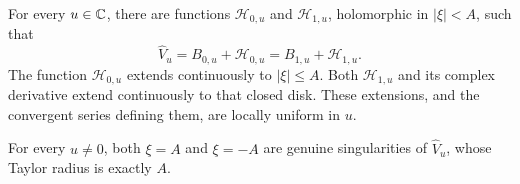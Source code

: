 \begin{theorem}
\label{thm:Borel-models}
For every $u\in\mathbb C$, there are functions $\mathcal H_{0,u}$ and
$\mathcal H_{1,u}$, holomorphic in $|\xi|<A$, such that
\begin{equation}\label{eq:Borel-decompositions}
 \widehat V_u=B_{0,u}+\mathcal H_{0,u}
             =B_{1,u}+\mathcal H_{1,u}.
\end{equation}
The function $\mathcal H_{0,u}$ extends continuously to $|\xi|\le A$.
Both $\mathcal H_{1,u}$ and its complex derivative extend continuously
to that closed disk. These extensions, and the convergent series defining
them, are locally uniform in $u$.

For every $u\ne0$, both $\xi=A$ and $\xi=-A$ are genuine singularities
of $\widehat V_u$, whose Taylor radius is exactly $A$.
\end{theorem}
